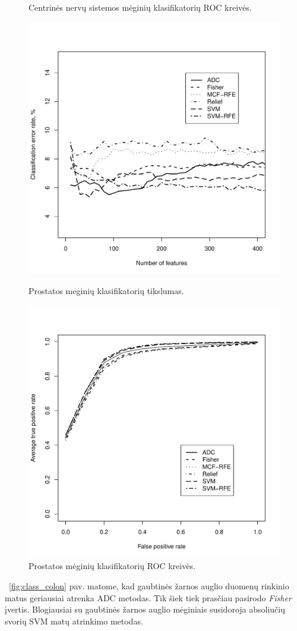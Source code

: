 \begin{figure}[H]
\begin{minipage}[b]{0.5\linewidth}
\caption{Centrinės nervų sistemos mėginių klasifikatorių ROC kreivės.}
\label{fig:roc_cns}
\end{minipage}
\hspace{0.2cm}
\begin{minipage}[b]{0.5\linewidth}
\centering
\includegraphics[width=.85\textwidth]{../bachelor/images/prostate_classification.pdf}
\caption{Prostatos meginių klasifikatorių tikslumas.}
\label{fig:class_prostate}
\end{minipage}
\hspace{0.2cm}
\begin{minipage}[b]{0.5\linewidth}
\centering
\includegraphics[width=.85\textwidth]{../bachelor/images/prostate_roc.pdf}
\caption{Prostatos mėginių klasifikatorių ROC kreivės.}
\label{fig:roc_prostate}
\end{minipage}
\end{figure}
~\ref{fig:class_colon} pav. matome, kad gaubtinės žarnos auglio duomenų rinkinio matus geriausiai atrenka ADC metodas. Tik šiek tiek prasčiau pasirodo \textit{Fisher} įvertis. Blogiausiai su gaubtinės žarnos auglio mėginiais susidoroja absoliučių svorių SVM matų atrinkimo metodas.

